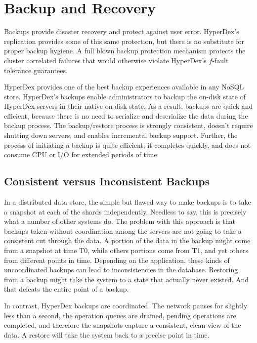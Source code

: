 \chapter{Backup and Recovery}
\label{chap:backups}

Backups provide disaster recovery and protect against user error.  HyperDex's
replication provides some of this same protection, but there is no substitute
for proper backup hygiene.  A full blown backup protection mechanism protects
the cluster correlated failures that would otherwise violate HyperDex's
$f$-fault tolerance guarantees.

HyperDex provides one of the best backup experiences available in any NoSQL
store.  HyperDex's backups enable administrators to backup the on-disk state of
HyperDex servers in their native on-disk state.  As a result, backups are quick
and efficient, because there is no need to serialize and deserialize the data
during the backup process.  The backup/restore process is strongly consistent,
doesn't require shutting down servers, and enables incremental backup support.
Further, the process of initiating a backup is quite efficient; it completes
quickly, and does not consume CPU or I/O for extended periods of time.

\section{Consistent versus Inconsistent Backups}

In a distributed data store, the simple but flawed way to make backups is to
take a snapshot at each of the shards independently.  Needless to say, this is
precisely what a number of other systems do.  The problem with this approach is
that backups taken without coordination among the servers are not going to take
a consistent cut through the data.  A portion of the data in the backup might
come from a snapshot at time T0, while others portions come from T1, and yet
others from different points in time.  Depending on the application, these kinds
of uncoordinated backups can lead to inconsistencies in the database.  Restoring
from a backup might take the system to a state that actually never existed. And
that defeats the entire point of a backup.

In contrast, HyperDex backups are coordinated.  The network pauses for slightly
less than a second, the operation queues are drained, pending operations are
completed, and therefore the snapshots capture a consistent, clean view of the
data.  A restore will take the system back to a precise point in time. 

